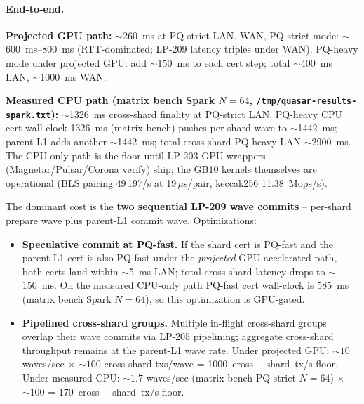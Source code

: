 \paragraph{End-to-end.} \textbf{Projected GPU path:}
$\sim$\SI{260}{\milli\second} at PQ-strict LAN. WAN, PQ-strict mode:
$\sim$\SI{600}{\milli\second}--\SI{800}{\milli\second}
(RTT-dominated; LP-209 latency triples under WAN). PQ-heavy mode
under projected GPU: add $\sim$\SI{150}{\milli\second} to each cert
step; total $\sim$\SI{400}{\milli\second} LAN,
$\sim$\SI{1000}{\milli\second} WAN.

\textbf{Measured CPU path (matrix bench Spark $N{=}64$,
\texttt{/tmp/quasar-results-spark.txt}):}
$\sim$\SI{1326}{\milli\second} cross-shard finality at PQ-strict
LAN. PQ-heavy CPU cert wall-clock \SI{1326}{\milli\second} (matrix
bench) pushes per-shard wave to $\sim$\SI{1442}{\milli\second};
parent L1 adds another $\sim$\SI{1442}{\milli\second}; total
cross-shard PQ-heavy LAN $\sim$\SI{2900}{\milli\second}. The
CPU-only path is the floor until LP-203 GPU wrappers
(Magnetar/Pulsar/Corona verify) ship; the GB10 kernels themselves
are operational (BLS pairing 49\,197/s at 19\,$\mu$s/pair, keccak256
\SI{11.38}{\mega ops/s}).

The dominant cost is the \textbf{two sequential LP-209 wave commits}
-- per-shard prepare wave plus parent-L1 commit wave.
Optimizations:

\begin{itemize}[leftmargin=2em,nosep]
\item \textbf{Speculative commit at PQ-fast.} If the shard cert is
  PQ-fast and the parent-L1 cert is also PQ-fast under the
  \emph{projected} GPU-accelerated path, both certs land within
  $\sim$\SI{5}{\milli\second} LAN; total cross-shard latency drops
  to $\sim$\SI{150}{\milli\second}. On the measured CPU-only path
  PQ-fast cert wall-clock is \SI{585}{\milli\second} (matrix bench
  Spark $N{=}64$), so this optimization is GPU-gated.
\item \textbf{Pipelined cross-shard groups.} Multiple in-flight
  cross-shard groups overlap their wave commits via LP-205
  pipelining; aggregate cross-shard throughput remains at the
  parent-L1 wave rate. Under projected GPU: $\sim 10$ waves/sec
  $\times$ $\sim 100$ cross-shard txs/wave = \SI{1000}{cross-shard tx/s}
  floor. Under measured CPU: $\sim 1.7$ waves/sec (matrix bench
  PQ-strict $N{=}64$) $\times$ $\sim 100$ = \SI{170}{cross-shard tx/s}
  floor.
\end{itemize}

